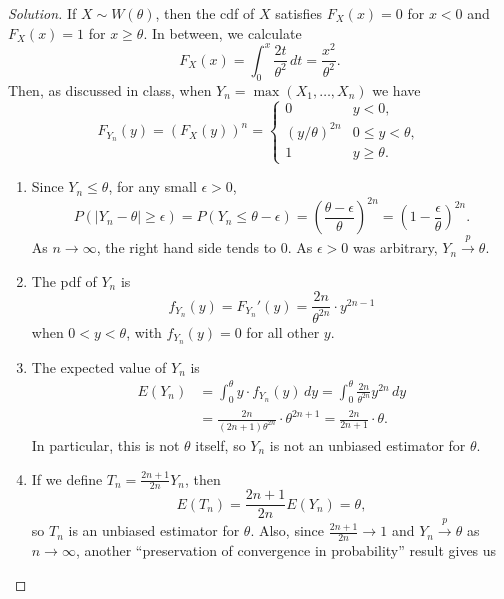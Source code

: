 \documentclass{article}
\begin{document}
\begin{proof}[Solution]
If $X\sim W(\theta)$, then the cdf of $X$ satisfies $F_X(x) = 0$ for $x < 0$ and $F_X(x) = 1$ for $x\geq\theta$. In between, we calculate
\begin{equation*}
F_X(x) = \int_0^x\frac{2t}{\theta^2}\,dt = \frac{x^2}{\theta^2}.
\end{equation*}
Then, as discussed in class, when $Y_n = \max(X_1, \ldots, X_n)$ we have
\begin{equation*}
F_{Y_n}(y) = (F_X(y))^n = \begin{cases} 0 & y < 0, \\ (y/\theta)^{2n} & 0\leq y < \theta, \\ 1 & y\geq\theta. \end{cases}
\end{equation*}
\begin{enumerate}[label=(\alph*)]
\item Since $Y_n\leq\theta$, for any small $\epsilon > 0$,
\begin{equation*}
P(\lvert Y_n - \theta\rvert\geq\epsilon) = P(Y_n\leq\theta - \epsilon) = \left(\frac{\theta - \epsilon}{\theta}\right)^{2n} = \left(1 - \frac{\epsilon}{\theta}\right)^{2n}.
\end{equation*}
As $n\to\infty$, the right hand side tends to $0$. As $\epsilon > 0$ was arbitrary, $Y_n\stackrel{p}{\to}\theta$.
\item The pdf of $Y_n$ is
\begin{equation*}
f_{Y_n}(y) = F_{Y_n}'(y) = \frac{2n}{\theta^{2n}}\cdot y^{2n - 1}
\end{equation*}
when $0 < y < \theta$, with $f_{Y_n}(y) = 0$ for all other $y$.
\item The expected value of $Y_n$ is
\begin{align*}
E(Y_n) &= \int_0^{\theta} y\cdot f_{Y_n}(y)\,dy = \int_0^{\theta} \frac{2n}{\theta^{2n}} y^{2n}\,dy \\
&= \frac{2n}{(2n + 1)\theta^{2n}}\cdot\theta^{2n + 1} = \frac{2n}{2n + 1}\cdot\theta.
\end{align*}
In particular, this is not $\theta$ itself, so $Y_n$ is not an unbiased estimator for $\theta$.
\item If we define $T_n = \frac{2n + 1}{2n}Y_n$, then
\begin{equation*}
E(T_n) = \frac{2n + 1}{2n}E(Y_n) = \theta,
\end{equation*}
so $T_n$ is an unbiased estimator for $\theta$. Also, since $\frac{2n + 1}{2n}\to 1$ and $Y_n\stackrel{p}{\to}\theta$ as $n\to\infty$, another ``preservation of convergence in probability'' result gives us

\end{enumerate}
\end{proof}
\end{document}
